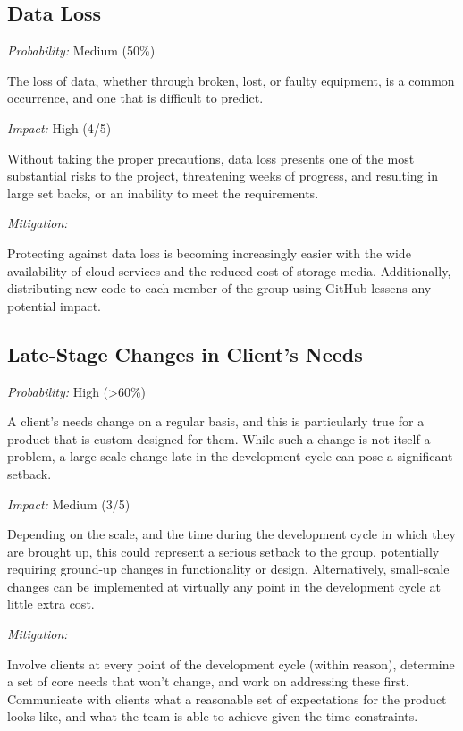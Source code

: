 \documentclass[11pt]{article}
\begin{document}
\subsection{Data Loss}
\textit{Probability:} Medium (50\%) \begin{addmargin}[1em]{2em} The loss of data, whether through
broken, lost, or faulty equipment, is a common occurrence, and one that is difficult to predict.
\end{addmargin}\vspace{2mm}
\noindent \textit{Impact:} High (4/5) \begin{addmargin}[1em]{2em} Without taking the proper
precautions, data loss presents one of the most substantial risks to the project, threatening
weeks of progress, and resulting in large set backs, or an inability to meet the requirements.
\end{addmargin}\vspace{2mm}
\noindent \textit{Mitigation:} \begin{addmargin}[1em]{2em} Protecting against data loss is becoming
increasingly easier with the wide availability of cloud services and the reduced cost of storage
media. Additionally, distributing new code to each member of the group using GitHub lessens any
potential impact.\end{addmargin}

\subsection{Late-Stage Changes in Client's Needs}
\textit{Probability:} High (\textgreater60\%) \begin{addmargin}[1em]{2em} A client’s needs change on
a regular basis, and this is particularly true for a product that is custom-designed for them. While
such a change is not itself a problem, a large-scale change late in the development cycle can pose a
significant setback.\end{addmargin}\vspace{2mm}
\noindent \textit{Impact:} Medium (3/5) \begin{addmargin}[1em]{2em} Depending on the
scale, and the time during the development cycle in which they are brought up,
this could represent a serious setback to the group, potentially requiring ground-up changes in
functionality or design. Alternatively, small-scale changes can be implemented at virtually any
point in the development cycle at little extra cost.\end{addmargin}\vspace{2mm}
\noindent \textit{Mitigation:} \begin{addmargin}[1em]{2em} Involve clients at every point of the
development cycle (within reason), determine a set of core needs that won’t change, and work on
addressing these first. Communicate with clients what a reasonable set of expectations for the
product looks like, and what the team is able to achieve given the time constraints. \end{addmargin}
\end{document}

